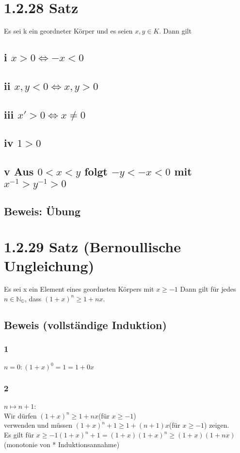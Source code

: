 \documentclass[11pt]{scrartcl}
\begin{document}
\section{1.2.28 Satz}
Es sei k ein geordneter Körper und es seien $x,y \in K$. Dann gilt
\subsection*{i $x > 0 \iff -x < 0 $}
\subsection*{ii $x,y < 0 \iff x,y > 0 $}
\subsection*{iii $x' > 0 \iff x \neq 0 $}
\subsection*{iv $1 > 0$}
\subsection*{v Aus  $0 < x < y$ folgt $-y < -x < 0$ mit $x^{-1} > y^{-1} > 0$}
\subsection*{Beweis: Übung}

\section{1.2.29 Satz (Bernoullische Ungleichung)}
Es sei x ein Element eines geordneten Körpers mit $x \geq -1$ Dann gilt für jedes $n \in \mathbb{N_{O}}$, dass $(1+x)^n \geq 1+nx$.
\subsection*{Beweis (vollständige Induktion)}
\subsubsection*{1}
$n = 0:(1+x)^0 =1= 1+0x$
\subsubsection*{2}
$n \longmapsto n+1$: \\
 Wir dürfen $(1+x)^n \geq 1+nx$(für $x \geq -1$) \\ verwenden und müssen $(1+x)^n+1 \geq 1+ (n+1)x$(für $x \geq -1$) zeigen. \\ Es gilt für $x \geq -1 (1+x)^n+1 = (1+x)(1+x)^n \geq (1+x)(1+nx)$ (monotonie von * Induktionsannahme) \\
\end{document}
